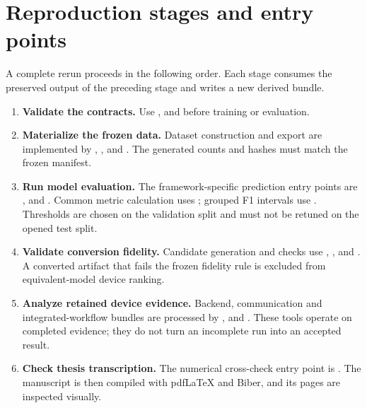 \section{Reproduction stages and entry points}

A complete rerun proceeds in the following order. Each stage consumes the
preserved output of the preceding stage and writes a new derived bundle.

\begin{enumerate}
  \item \textbf{Validate the contracts.} Use
  ,
   and
   before training or
  evaluation.
  \item \textbf{Materialize the frozen data.} Dataset construction and export
  are implemented by ,
  ,
   and
  . The generated counts and hashes
  must match the frozen manifest.
  \item \textbf{Run model evaluation.} The framework-specific prediction entry
  points are ,
   and
  . Common metric calculation uses
  ; grouped F1 intervals use
  . Thresholds are chosen on the
  validation split and must not be retuned on the opened test split.
  \item \textbf{Validate conversion fidelity.} Candidate generation and checks
  use ,
  ,
   and
  . A converted artifact that
  fails the frozen fidelity rule is excluded from equivalent-model device
  ranking.
  \item \textbf{Analyze retained device evidence.} Backend, communication and
  integrated-workflow bundles are processed by
  ,
   and
  . These tools operate on completed
  evidence; they do not turn an incomplete run into an accepted result.
  \item \textbf{Check thesis transcription.} The numerical cross-check entry
  point is . The manuscript is
  then compiled with pdfLaTeX and Biber, and its pages are inspected visually.
\end{enumerate}


